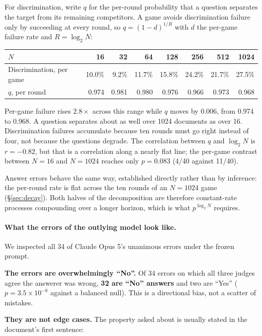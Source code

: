 \documentclass[11pt]{article}
\begin{document}
For discrimination, write $q$ for the per-round probability that a question
separates the target from its remaining competitors. A game avoids
discrimination failure only by succeeding at every round, so $q = (1-d)^{1/R}$
with $d$ the per-game failure rate and $R=\log_2 N$:

\begin{center}\small
\begin{tabular}{lrrrrrrr}
\toprule
$N$ & 16 & 32 & 64 & 128 & 256 & 512 & 1024 \\
\midrule
Discrimination, per game & 10.0\% & 9.2\% & 11.7\% & 15.8\% & 24.2\% & 21.7\% & 27.5\% \\
$q$, per round           & 0.974 & 0.981 & 0.980 & 0.976 & 0.966 & 0.973 & 0.968 \\
\bottomrule
\end{tabular}
\end{center}

\noindent Per-game failure rises $2.8\times$ across this range while $q$ moves
by 0.006, from 0.974 to 0.968. A question separates about as well over 1024
documents as over 16. Discrimination failures accumulate because ten rounds must
go right instead of four, not because the questions degrade. The correlation
between $q$ and $\log_2 N$ is $r=-0.82$, but that is a correlation along a
nearly flat line; the per-game contrast between $N{=}16$ and $N{=}1024$ reaches
only $p=0.083$ (4/40 against 11/40).

Answer errors behave the same way, established directly rather than by
inference: the per-round rate is flat across the ten rounds of an $N{=}1024$
game (\S\ref{sec:decay}). Both halves of the decomposition are therefore
constant-rate processes compounding over a longer horizon, which is what
$p^{\log_2 N}$ requires.

\paragraph{What the errors of the outlying model look like.} We inspected all
34 of Claude Opus 5's unanimous errors under the frozen prompt.

\textbf{The errors are overwhelmingly ``No''.} Of 34 errors on which all three
judges agree the answerer was wrong, \textbf{32 are ``No'' answers} and two are
``Yes'' ($p = 3.5\times10^{-8}$ against a balanced null). This is a directional
bias, not a scatter of mistakes.

\textbf{They are not edge cases.} The property asked about is usually stated in
the document's first sentence:
\end{document}

